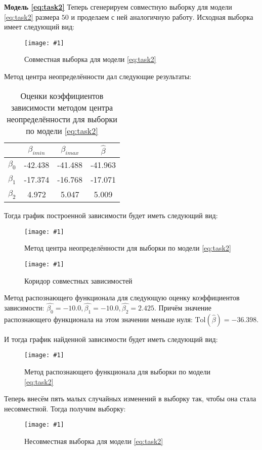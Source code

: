 \documentclass[a4paper,12pt]{article}
\newcommand{\plot}[3]{
    \begin{figure}[H]
        \texttt{[image: \#1]}
        \caption{#2}
        \label{#3}
    \end{figure}
}
\begin{document}
    \noindent\textbf{Модель \ref{eq:task2}} \newline
    Теперь сгенерируем совместную выборку для модели \ref{eq:task2} размера $ 50 $ и проделаем с ней аналогичную работу.
    Исходная выборка имеет следующий вид:
    \plot{ValidData50}{Совместная выборка для модели \ref{eq:task2}}{p:validdata50}

    \noindent Метод центра неопределённости дал следующие результаты:
    \begin{table}[H]
        \begin{center}
            \begin{tabular}{| c | c | c | c |}
                \hline
                & $ \beta_{imin} $ & $ \beta_{imax} $ & $ \hat{\beta} $ \\
                \hline
                $ \beta_{0} $ & -42.438 & -41.488 & -41.963 \\
                \hline
                $ \beta_{1} $ & -17.374 & -16.768 & -17.071 \\
                \hline
                $ \beta_{2} $ & 4.972 & 5.047 & 5.009 \\
                \hline
            \end{tabular}
        \end{center}
        \caption{Оценки коэффициентов зависимости методом центра неопределённости для выборки по модели \ref{eq:task2}}
        \label{t:validdata50}
    \end{table}

    \noindent Тогда график построенной зависимости будет иметь следующий вид:
    \plot{UndefinedCenterValidData50}{Метод центра неопределённости для выборки по модели \ref{eq:task2}}{p:ucvaliddata50}
    \plot{CorridorUndefinedCenterValidData50}{Коридор совместных зависимостей}{p:corridorvaliddata50}

    \noindent Метод распознающего функционала для следующую оценку коэффициентов зависимости:
    $ \hat{\beta_{0}} = -10.0, \hat{\beta_{1}} = -10.0, \hat{\beta_{2}} = 2.425 $.
    Причём значение распознающего функционала на этом значении меньше нуля: $ \text{Tol}(\hat{\beta}) = -36.398 $.
    
    \noindent И тогда график найденной зависимости будет иметь следующий вид:
    \plot{TolValidData50}{Метод распознающего функционала для выборки по модели \ref{eq:task2}}{p:tolvaliddata50}

    \noindent Теперь внесём пять малых случайных изменений в выборку так, чтобы она стала несовместной. Тогда получим выборку:
    \plot{DataWithEstims50}{Несовместная выборка для модели \ref{eq:task2}}{p:estimdata50}
\end{document}
